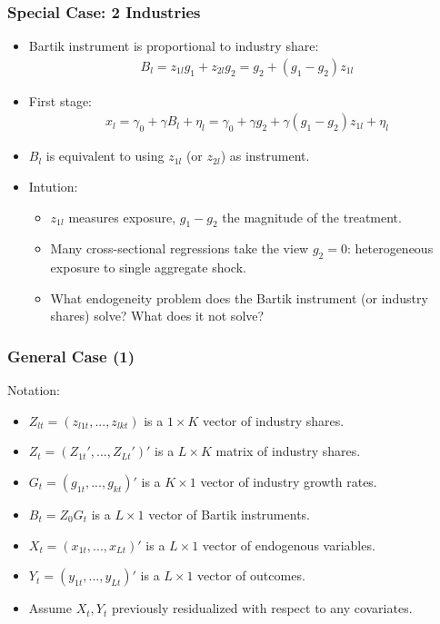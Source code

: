 \documentclass[english,xcolor=svgnames]{beamer}
\begin{document}
\begin{frame}
\frametitle[alignment=center]{Special Case: 2 Industries}
\begin{itemize}
	\item Bartik instrument is proportional to industry share:
	\begin{align*}
		B_l = z_{1l}g_1+z_{2l}g_2 = g_2 + (g_1-g_2)z_{1l}
	\end{align*}
	\item First stage:
	\begin{align*}
		x_l = \gamma_0 + \gamma B_l + \eta_l = \gamma_0 + \gamma g_2 + \gamma (g_1-g_2)z_{1l} + \eta_l 
	\end{align*}
	\item $B_l$ is equivalent to using $z_{1l}$ (or $z_{2l}$) as instrument.
	\item Intution:
	\begin{itemize}
		\item $z_{1l}$ measures exposure, $g_1-g_2$ the magnitude of the treatment.
		\item Many cross-sectional regressions take the view $g_2=0$: heterogeneous exposure to single aggregate shock.
		\item What endogeneity problem does the Bartik instrument (or industry shares) solve? What does it not solve?
	\end{itemize}
\end{itemize}
\end{frame}


\begin{frame}
\frametitle[alignment=center]{General Case (1)}
Notation:
\begin{itemize}
	\item $Z_{lt}=(z_{l1t},...,z_{lkt})$ is a $1\times K$ vector of industry  shares.
	\item $Z_t = (Z_{1t}',...,Z_{Lt}')'$ is a $L\times K$ matrix of industry shares.
	\item $G_{t}=(g_{1t},...,g_{kt})'$ is a $K\times 1$ vector of industry growth rates.
	\item $B_t = Z_0 G_t$ is a $L\times 1$ vector of Bartik instruments.
	\item $X_t=(x_{1t},...,x_{Lt})'$ is a $L\times 1$ vector of endogenous variables.
	\item $Y_t=(y_{1t},...,y_{Lt})'$ is a $L\times 1$ vector of outcomes.
	\item Assume $X_t,Y_t$ previously residualized with respect to any covariates.
\end{itemize}
\end{frame}
\end{document}
